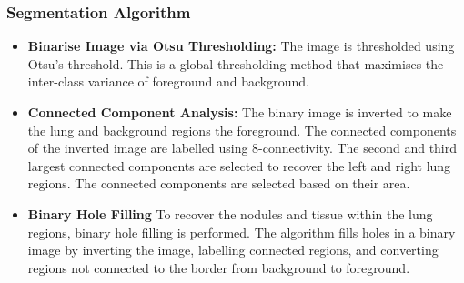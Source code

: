 \documentclass[11pt]{article}
\begin{document}
\subsubsection{Segmentation Algorithm}
\begin{itemize}
    \item \textbf{Binarise Image via Otsu Thresholding:} The image is thresholded using Otsu's threshold. This is a global thresholding method that maximises the inter-class variance of foreground and background. 
    \item \textbf{Connected Component Analysis:} The binary image is inverted to make the lung and background regions the foreground. The connected components of the inverted image are labelled using 8-connectivity. The second and third largest connected components are selected to recover the left and right lung regions. The connected components are selected based on their area. 
    \item \textbf{Binary Hole Filling} To recover the nodules and tissue within the lung regions, binary hole filling is performed. The algorithm fills holes in a binary image by inverting the image, labelling connected regions, and converting regions not connected to the border from background to foreground.
    \end{itemize}
\end{document}
